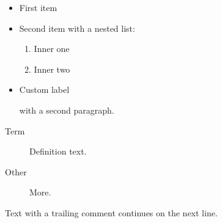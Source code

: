 \documentclass{article}
\begin{document}
\begin{itemize}
  \item First item
  \item Second item with a nested list:
    \begin{enumerate}
      \item Inner one
      \item Inner two
    \end{enumerate}
  \item[$\star$] Custom label

    with a second paragraph.
\end{itemize}

\begin{description}
  \item[Term] Definition text.
  \item[Other] More.
\end{description}


Text with a trailing comment %
continues on the next line.
\end{document}
